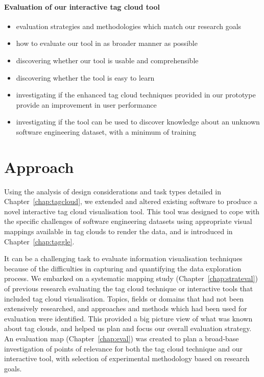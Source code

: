 \paragraph{Evaluation of our interactive tag cloud tool}
\begin{itemize}
\item evaluation strategies and methodologies which match our research goals
\item how to evaluate our tool in as broader manner as possible
\item discovering whether our tool is usable and comprehensible
\item discovering whether the tool is easy to learn
\item investigating if the enhanced tag cloud techniques provided in our prototype provide an improvement in user performance
\item investigating if the tool can be used to discover knowledge about an unknown software engineering dataset, with a minimum of training
\end{itemize} 


\section{Approach}

Using the analysis of design considerations and task types detailed in Chapter~\ref{chap:tagcloud}, we extended and altered existing software to produce a novel interactive tag cloud visualisation tool. This tool was designed to cope with the specific challenges of software engineering datasets using appropriate visual mappings available in tag clouds to render the data, and is introduced in Chapter~\ref{chap:taggle}.

It can be a challenging task to evaluate information visualisation techniques because of the difficulties in capturing and quantifying the data exploration process. We embarked on a systematic mapping study (Chapter~\ref{chap:strateval}) of previous research evaluating the tag cloud technique or interactive tools that included tag cloud visualisation. Topics, fields or domains that had not been extensively researched, and approaches and methods which had been used for evaluation were identified. This provided a big picture view of what was known about tag clouds, and helped us plan and focus our overall evaluation strategy. An evaluation map (Chapter~\ref{chap:eval}) was created to plan a broad-base investigation of points of relevance for both the tag cloud technique and our interactive tool, with selection of experimental methodology based on research goals.

